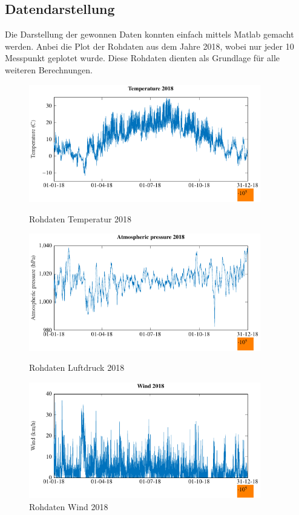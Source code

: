 \begin{refsection}
\newpage

\subsection{Datendarstellung}
Die Darstellung der gewonnen Daten konnten einfach mittels Matlab gemacht werden. Anbei die Plot der Rohdaten aus dem Jahre 2018, wobei nur jeder 10 Messpunkt geplotet wurde. Diese Rohdaten dienten als Grundlage für alle weiteren Berechnungen. 
\begin{figure}[h]
	\centering
	\includegraphics[width=0.9\textwidth]{papers/wwt/images/raw_temp_wwt.pdf}
	\caption{Rohdaten Temperatur 2018}
	\label{fig:rawdata_temp_airp}
	\includegraphics[width=0.9\textwidth]{papers/wwt/images/raw_airp_wwt.pdf}
	\caption{Rohdaten Luftdruck 2018}
	\label{fig:rawdata_temp_airp}
	\includegraphics[width=0.9\textwidth]{papers/wwt/images/raw_wind_wwt.pdf}
	\caption{Rohdaten Wind 2018}
	\label{fig:rawdata_temp_airp}
\end{figure}
\begin{figure}[h]
	\centering
	

\end{figure}
\end{refsection}
